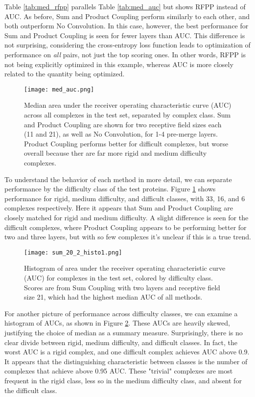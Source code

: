 Table \ref{tab:med_rfpp} parallels Table \ref{tab:med_auc} but shows RFPP instead of AUC.
As before, Sum and Product Coupling perform similarly to each other, and both outperform No Convolution.
In this case, however, the best performance for Sum and Product Coupling is seen for fewer layers than AUC.
This difference is not surprising, considering the cross-entropy loss function leads to optimization of performance on \emph{all} pairs, not just the top scoring ones.
In other words, RFPP is not being explicitly optimized in this example, whereas AUC is more closely related to the quantity being optimized.

\begin{figure}
	\texttt{[image: med\_auc.png]}
	\caption{Median area under the receiver operating characteristic curve (AUC) across all complexes in the test set, separated by complex class. Sum and Product Coupling are shown for two receptive field sizes each (11 and 21), as well as No Convolution, for 1-4 pre-merge layers. Product Coupling performs better for difficult complexes, but worse overall because ther are far more rigid and medium difficulty complexes.
		\label{fig:med_auc}}
\end{figure}

To understand the behavior of each method in more detail, we can separate performance by the difficulty class of the test proteins.
Figure \ref{fig:med_auc} shows performance for rigid, medium difficulty, and difficult classes, with 33, 16, and 6 complexes respectively.
Here it appears that Sum and Product Coupling are closely matched for rigid and medium difficulty.
A slight difference is seen for the difficult complexes, where Product Coupling appears to be performing better for two and three layers, but with so few complexes it's unclear if this is a true trend.

\begin{figure}
	\texttt{[image: sum\_20\_2\_histo1.png]}
	\caption{Histogram of area under the receiver operating characteristic curve (AUC) for complexes in the test set, colored by difficulty class. Scores are from Sum Coupling with two layers and receptive field size 21, which had the highest median AUC of all methods.}
	\label{fig:histo1}
\end{figure}

For another picture of performance across difficulty classes, we can examine a histogram of AUCs, as shown in Figure \ref{fig:histo1}.
These AUCs are heavily skewed, justifying the choice of median as a summary measure.
Surprisingly, there is no clear divide between rigid, medium difficulty, and difficult classes.
In fact, the worst AUC is a rigid complex, and one difficult complex achieves AUC above 0.9.
It appears that the distinguishing characteristic between classes is the number of complexes that achieve above 0.95 AUC.
These "trivial" complexes are most frequent in the rigid class, less so in the medium difficulty class, and absent for the difficult class.

